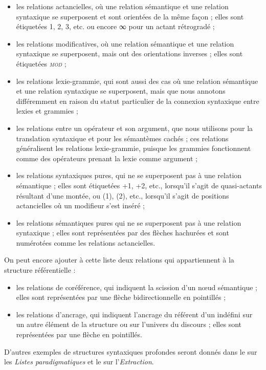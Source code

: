 \begin{itemize}
\item	les relations actancielles, où une relation sémantique et une relation syntaxique se superposent et sont orientées de la même façon ; elles sont étiquetées 1, 2, 3, etc. ou encore ∞ pour un actant rétrogradé ;
\item	les relations modificatives, où une relation sémantique et une relation syntaxique se superposent, mais ont des orientations inverses ; elles sont étiquetées \textit{\textsc{mod}} ;
\item	les relations lexie-grammie, qui sont aussi des cas où une relation sémantique et une relation syntaxique se superposent, mais que nous annotons différemment en raison du statut particulier de la connexion syntaxique entre lexies et grammies ;
\item	les relations entre un opérateur et son argument, que nous utilisons pour la translation syntaxique et pour les sémantèmes cachés ; ces relations généralisent les relations lexie-grammie, puisque les grammies fonctionnent comme des opérateurs prenant la lexie comme argument ;
\item	les relations syntaxiques pures, qui ne se superposent pas à une relation sémantique ; elles sont étiquetées +1, +2, etc., lorsqu'il s'agit de quasi-actants résultant d'une montée, ou (1), (2), etc., lorsqu'il s'agit de positions actancielles où un modifieur s'est inséré ;
\item	les relations sémantiques pures qui ne se superposent pas à une relation syntaxique ; elles sont représentées par des flèches hachurées et sont numérotées comme les relations actancielles.
\end{itemize}

On peut encore ajouter à cette liste deux relations qui appartiennent à la structure référentielle :

\begin{itemize}
\item	les relations de coréférence, qui indiquent la scission d’un nœud sémantique ; elles sont représentées par une flèche bidirectionnelle en pointillés ;
\item	les relations d’ancrage, qui indiquent l’ancrage du référent d’un indéfini sur un autre élément de la structure ou sur l’univers du discours ; elles sont représentées par une flèche en pointillés.
\end{itemize}

D’autres exemples de structures syntaxiques profondes seront donnés dans le  sur les \textit{Listes paradigmatiques} et le  sur l’\textit{Extraction}.

